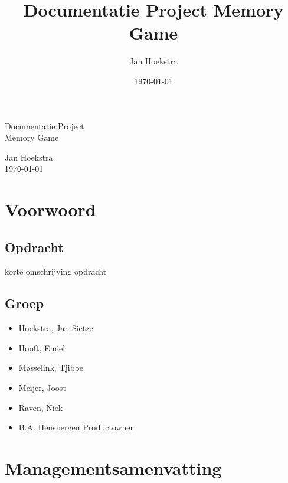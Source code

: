 \documentclass[a4paper,titlepage,11pt]{article}
\title{Documentatie Project Memory Game}
\date{\today}
\author{Jan Hoekstra}
\def\myauthor{Jan Hoekstra}
\def\mytitle{Documentatie Project} %
\def\mysubtitle{Memory Game}
\def\mydate{\today} %
\begin{document}

\begin{titlepage}
\vspace{5cm}

\centering
\vspace*{\fill}
\parbox[c][5cm][t]{10cm}{
  \color{white}\Huge\centering

  \mytitle \\
  \mysubtitle
  
  \vspace{3cm}
\huge
  \myauthor \\
  \mydate

}
\vspace*{\fill}

\end{titlepage}

\tableofcontents
\clearpage
{}

\section{Voorwoord}

\subsection{Opdracht}

korte omschrijving opdracht

\subsection{Groep}

\begin{itemize}
\item Hoekstra, Jan Sietze
\item Hooft, Emiel
\item Masselink, Tjibbe
\item Meijer, Joost
\item Raven, Niek
\item B.A. Hensbergen \- Productowner
\end{itemize}

\clearpage

\section{Managementsamenvatting}
\end{document}
